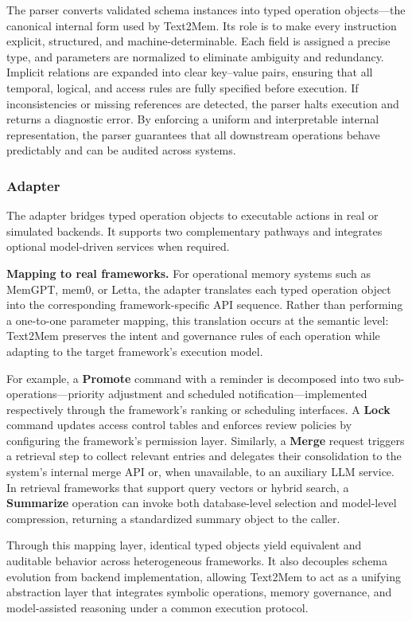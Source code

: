 \documentclass[conference]{IEEEtran}
\begin{document}
The parser converts validated schema instances into typed operation objects—the canonical internal form used by Text2Mem.  
Its role is to make every instruction explicit, structured, and machine-determinable.  
Each field is assigned a precise type, and parameters are normalized to eliminate ambiguity and redundancy.  
Implicit relations are expanded into clear key–value pairs, ensuring that all temporal, logical, and access rules are fully specified before execution.  
If inconsistencies or missing references are detected, the parser halts execution and returns a diagnostic error.  
By enforcing a uniform and interpretable internal representation, the parser guarantees that all downstream operations behave predictably and can be audited across systems.

\subsubsection{\textbf{Adapter}}
The adapter bridges typed operation objects to executable actions in real or simulated backends.  
It supports two complementary pathways and integrates optional model-driven services when required.

\textbf{Mapping to real frameworks.}  
For operational memory systems such as MemGPT, mem0, or Letta, the adapter translates each typed operation object into the corresponding framework-specific API sequence.  
Rather than performing a one-to-one parameter mapping, this translation occurs at the semantic level: Text2Mem preserves the intent and governance rules of each operation while adapting to the target framework’s execution model.  

For example, a \textbf{Promote} command with a reminder is decomposed into two sub-operations—priority adjustment and scheduled notification—implemented respectively through the framework’s ranking or scheduling interfaces.  
A \textbf{Lock} command updates access control tables and enforces review policies by configuring the framework’s permission layer.  
Similarly, a \textbf{Merge} request triggers a retrieval step to collect relevant entries and delegates their consolidation to the system’s internal merge API or, when unavailable, to an auxiliary LLM service.  
In retrieval frameworks that support query vectors or hybrid search, a \textbf{Summarize} operation can invoke both database-level selection and model-level compression, returning a standardized summary object to the caller.  

Through this mapping layer, identical typed objects yield equivalent and auditable behavior across heterogeneous frameworks.  
It also decouples schema evolution from backend implementation, allowing Text2Mem to act as a unifying abstraction layer that integrates symbolic operations, memory governance, and model-assisted reasoning under a common execution protocol.
\end{document}
